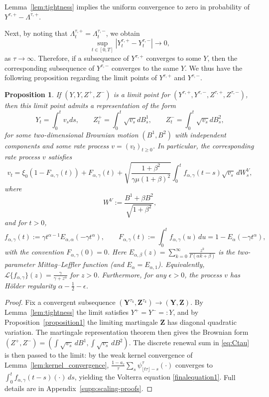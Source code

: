 \documentclass[letterpaper]{article}
\numberwithin{equation}{section}
\newtheorem{proposition}[theorem]{Proposition}
\theoremstyle{definition}
\theoremstyle{remark}
\begin{document}
Lemma~\ref{lem:tightness} implies the uniform convergence to zero in probability of $Y^{\tau,+} - \Lambda^{\tau,+}$.

Next, by noting that
$\Lambda_t^{\tau,+} = \Lambda_t^{\tau,-}$,
we obtain
\[
  \sup_{t \in [0,T]} \left|Y_t^{\tau,+} - Y_t^{\tau,-}\right| \rightarrow 0,
\]
as $\tau \rightarrow \infty$. Therefore, if a subsequence of $Y^{\tau,+}$ converges to some $Y$, then the corresponding subsequence of $Y^{\tau,-}$ converges to the same $Y$. We thus have the following proposition regarding the limit points of $Y^{\tau,+}$ and $Y^{\tau,-}$.

\begin{proposition}\label{prop2}
  If $(Y,Y,Z^+,Z^-)$ is a limit point for $(Y^{\tau,+},Y^{\tau,-},Z^{\tau,+},Z^{\tau,-})$, then this limit point admits a representation of the form
  \[
    Y_t=\int_0^t v_sds,\qquad Z_t^+=\int_0^t\sqrt{v_s}dB_s^1,\qquad Z_t^-=\int_0^t\sqrt{v_s}dB_s^2,
  \]
  for some two-dimensional Brownian motion $(B^1,B^2)$ with independent components and some rate process $v=(v_t)_{t\ge 0}$. In particular, the corresponding rate process $v$ satisfies
  \begin{equation}\label{finalequation1}
    v_t
    = \xi_0\left(1-F_{\alpha,\gamma}(t)\right)+F_{\alpha,\gamma}(t)
    + \sqrt{\frac{1+\beta^2}{\gamma\mu(1+\beta)^2}}
      \int_0^t f_{\alpha,\gamma}(t-s)\sqrt{v_s}\,dW_s^V,
  \end{equation}
  where
    \[
    W^V:=\frac{B^1+\beta B^2}{\sqrt{1+\beta^2}},
  \]
  and for $t>0$,
    \[
    f_{\alpha,\gamma}(t):=\gamma t^{\alpha-1}E_{\alpha,\alpha}(-\gamma t^\alpha),
    \qquad
    F_{\alpha,\gamma}(t):=\int_0^t f_{\alpha,\gamma}(u)\,du
    =1-E_{\alpha}(-\gamma t^\alpha),
  \]
  with the convention $F_{\alpha,\gamma}(0)=0$. Here $E_{\alpha,\beta}(z)=\sum_{k=0}^\infty \frac{z^k}{\Gamma(\alpha k+\beta)}$ is the two-parameter Mittag--Leffler function (and $E_\alpha=E_{\alpha,1}$). Equivalently, $\mathcal{L}\{f_{\alpha,\gamma}\}(z)=\frac{\gamma}{\gamma+z^\alpha}$ for $z>0$.
  Furthermore, for any $\epsilon>0$, the process $v$ has H\"older regularity $\alpha-\frac12-\epsilon$.
\end{proposition}

\begin{proof}
{Fix a convergent subsequence $(\mathbf{Y}^{\tau_k},\mathbf{Z}^{\tau_k})\to(\mathbf{Y},\mathbf{Z})$. By Lemma~\ref{lem:tightness} the limit satisfies $Y^+=Y^-=:Y$, and by Proposition~\ref{proposition1} the limiting martingale $\mathbf{Z}$ has diagonal quadratic variation. The martingale representation theorem then gives the Brownian form $(Z^+,Z^-)=(\int\sqrt{v_s}\,dB^1,\int\sqrt{v_s}\,dB^2)$. The discrete renewal sum in \eqref{eq:Ctau} is then passed to the limit: by the weak kernel convergence of Lemma~\ref{lem:kernel_convergence}, $\frac{1-a_\tau}{\tau}\sum_s\psi_{\lfloor t\tau\rfloor-s}^\tau(\cdot)$ converges to $\int_0^t f_{\alpha,\gamma}(t-s)(\cdot)\,ds$, yielding the Volterra equation \eqref{finalequation1}.} Full details are in Appendix~\ref{supp:scaling-proofs}.
\end{proof}
\end{document}
